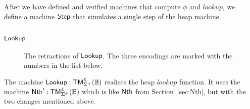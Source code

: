After we have defined and verified machines that compute $\phi$ and $lookup$, we define a machine $\mathsf{Step}$ that simulates a single step of the heap
machine.


\subsection{$\mathsf{Lookup}$}
\label{sec:Lookup}
%

\enlargethispage{0.5cm}

\begin{figure}[t]
  \centering
  \small
  \caption{The retractions of $\mathsf{Lookup}$.  The three encodings are marked with the numbers in the list below.}
  \label{fig:retracts-Lookup}
\end{figure}

The machine $\mathsf{Lookup} : \mathsf{TM}_{\Sigma^+}^5(\mathbb{B})$ realises the heap $lookup$ function.  It uses the machine $\mathsf{Nth}' : \mathsf{TM}_{\Sigma^+}^4(\mathbb{B})$
which is like $\mathsf{Nth}$ from Section~\ref{sec:Nth}, but with the two changes mentioned above.

